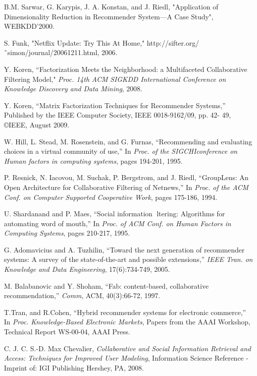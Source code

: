 \documentclass[oneside,13pt]{extreport}
\begin{document}


\begin{thebibliography}{10}
B.M. Sarwar, G. Karypis, J. A. Konstan, and J. Riedl, "Application of Dimensionality Reduction in Recommender System—A Case Study", WEBKDD’2000.

S. Funk, "Netflix Update: Try This At Home," http://sifter.org/˜simon/journal/20061211.html, 2006.

Y. Koren, “Factorization Meets the Neighborhood: a Multifaceted Collaborative Filtering
Model," \emph{Proc. 14th ACM SIGKDD International Conference on Knowledge Discovery and
Data Mining}, 2008.

Y. Koren, “Matrix Factorization Techniques for Recommender Systems,” Published by the IEEE Computer Society, IEEE 0018-9162/09, pp. 42- 49, ©IEEE, August 2009.

W. Hill, L. Stead, M. Rosenstein, and G. Furnas, “Recommending and evaluating choices in a virtual community of use,” In \emph{Proc. of the SIGCHIconference on Human factors in computing systems}, pages 194-201, 1995.

P. Resnick, N. Iacovou, M. Suchak, P. Bergstrom, and J. Riedl, “GroupLens: An Open Architecture for Collaborative Filtering of Netnews,” In \emph{Proc. of the ACM Conf. on Computer Supported Cooperative Work}, pages 175-186, 1994.

U. Shardanand and P. Maes, “Social information ltering: Algorithms
for automating word of mouth,” In \emph{Proc. of ACM Conf. on Human Factors in Computing Systems}, pages 210-217, 1995.

G. Adomavicius and A. Tuzhilin, “Toward the next generation of recommender systems: A survey of the state-of-the-art and possible extensions,” \emph{IEEE Tran. on Knowledge and Data Engineering}, 17(6):734-749, 2005.

M. Balabanovic and Y. Shoham, “Fab: content-based, collaborative recommendation,” \emph{Comm},  ACM, 40(3):66-72, 1997.

T.Tran, and R.Cohen, “Hybrid recommender systems for electronic commerce,” In \emph{Proc. Knowledge-Based Electronic Markets},  Papers from the AAAI Workshop, Technical Report WS-00-04, AAAI Press.


C. J. C. S.-D. Max Chevalier, \emph{Collaborative and Social Information Retrieval and Access: Techniques for Improved User Modeling}, Information Science Reference - Imprint of: IGI Publishing Hershey, PA, 2008. 


\end{thebibliography}
\end{document}

